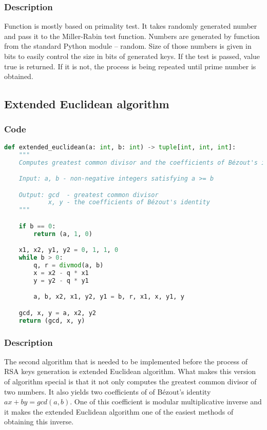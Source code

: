 \documentclass{article}
\begin{document}
\normalsize

\subsubsection{Description}
Function is mostly based on primality test. It takes randomly generated number and
pass it to the Miller-Rabin test function. Numbers are generated by function from
the standard Python module -- random. Size of those numbers is given in bits to
easily control the size in bits of generated keys. If the test is passed, value true is returned.
If it is not, the process is being repeated until prime number is obtained.

\subsection{Extended Euclidean algorithm}
\subsubsection{Code}

\small

\begin{lstlisting}[language=Python]
    def extended_euclidean(a: int, b: int) -> tuple[int, int, int]:
    """
    Computes greatest common divisor and the coefficients of Bézout's identity.

    Input: a, b - non-negative integers satisfying a >= b

    Output: gcd  - greatest common divisor
            x, y - the coefficients of Bézout's identity
    """

    if b == 0:
        return (a, 1, 0)

    x1, x2, y1, y2 = 0, 1, 1, 0
    while b > 0:
        q, r = divmod(a, b)
        x = x2 - q * x1
        y = y2 - q * y1

        a, b, x2, x1, y2, y1 = b, r, x1, x, y1, y

    gcd, x, y = a, x2, y2
    return (gcd, x, y)
\end{lstlisting}

\normalsize

\subsubsection{Description}
The second algorithm that is needed to be implemented before the process of RSA keys generation
is extended Euclidean algorithm. What makes this version of algorithm special is that it not only
computes the greatest common divisor of two numbers. It also yields two coefficients of of Bézout's identity
$ax + by = gcd(a, b)$. One of this coefficient is modular multiplicative inverse and it makes the extended
Euclidean algorithm one of the easiest methods of obtaining this inverse.
\end{document}
